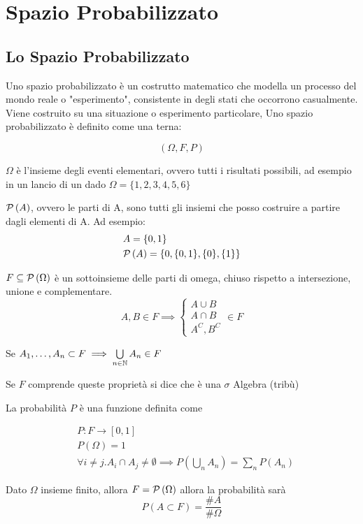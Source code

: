 \chapter{Spazio Probabilizzato}

\section{Lo Spazio Probabilizzato}
Uno spazio probabilizzato è un costrutto matematico che modella un processo del mondo reale o "esperimento", consistente in degli stati che occorrono casualmente. Viene costruito su una situazione o esperimento particolare, Uno spazio probabilizzato è definito come una terna:

\[ (\Omega, F, P) \]

$ \Omega $ è l'insieme degli eventi elementari, ovvero tutti i risultati possibili, ad esempio in un lancio di un dado $ \Omega = \{1,2,3,4,5,6\} $

$ \mathcal{P}\left(A\right)$, ovvero le parti di A, sono tutti gli insiemi che posso costruire a partire dagli elementi di A. Ad esempio:
\begin{align*}
& A = \{0, 1\} \\
& \mathcal{P}\left(A\right) = \{0, \{0, 1\}, \{0\}, \{1\}\}
\end{align*}

$ F \subseteq \mathcal{P}\left(\Omega\right) $ è un sottoinsieme delle parti di omega, chiuso rispetto a intersezione, unione e complementare.
\[ A,B \in F \implies \begin{cases}
A \cup B \\
A \cap B \\
A^C, B^C
\end{cases} \in F\]

Se $ A_1, \dots, A_n \subset F \implies \bigcup\limits_{n \in \mathbb{N}} A_n \in F $

Se $ F $ comprende queste proprietà si dice che è una $ \sigma $ Algebra (tribù)

La probabilità $ P $ è una funzione definita come

\begin{align*}
&P : F \to [0,1] \\
& P(\Omega) = 1 \\
& \forall i \neq j . A_i \cap A_j \neq \emptyset \implies P \left( \bigcup\limits_{n} A_n \right) = \sum_{n} P(A_n)
\end{align*}

Dato $ \Omega $ insieme finito, allora $ F = \mathcal{P}\left(\Omega\right) $ allora la probabilità sarà
\[  P (A \subset F) = \dfrac{\#A}{\#\Omega} \]

